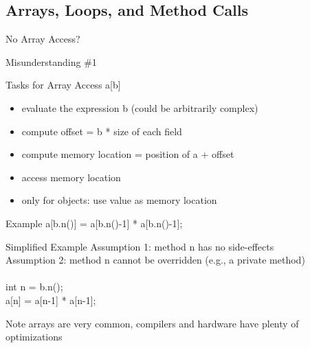 \subsection{Arrays, Loops, and Method Calls}
\begin{frame}{No Array Access?}
	\begin{fancycolumns}
		\begin{example}{Misunderstanding \#1}
		\end{example}
		\begin{definition}{{Tasks for Array Access a[b]}}
			\begin{itemize}
				\item evaluate the expression b (could be arbitrarily complex)
				\item compute offset = b * size of each field
				\item compute memory location = position of a + offset
				\item access memory location
				\item only for objects: use value as memory location
			\end{itemize}
		\end{definition}
		\nextcolumn
		\begin{example}{Example}
			a[b.n()] = a[b.n()-1] * a[b.n()-1];
		\end{example}
		\begin{example}{Simplified Example}
			Assumption 1: method n has no side-effects\\Assumption 2: method n cannot be overridden (e.g., a private method)\\~\\int n = b.n();\\a[n] = a[n-1] * a[n-1];
		\end{example}
		\begin{note}{Note}
			arrays are very common, compilers and hardware have plenty of optimizations
		\end{note}
	\end{fancycolumns}
\end{frame}

